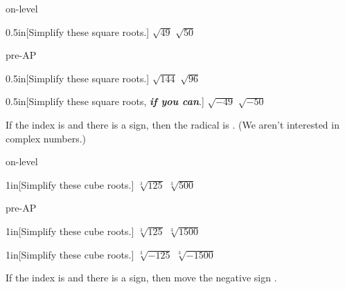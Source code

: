 \begin{taggedblock}{on-level}
    \begin{my2Problems}{0.5in}[Simplify these square roots.]
        {
            $\sqrt{49}$ 
        }
        {
            $\sqrt{50}$ 
        }
    \end{my2Problems}
\end{taggedblock}
\begin{taggedblock}{pre-AP}
    \begin{my2Problems}{0.5in}[Simplify these square roots.]
        {
                $\sqrt{144}$ 
            }
            {
                $\sqrt{96}$ 
            }
    \end{my2Problems}
\end{taggedblock}

\begin{my2Problems}{0.5in}[Simplify these square roots, {\bfseries\itshape if you can}.]
    {
        $\sqrt{-49}$ 
    }
    {
        $\sqrt{-50}$ 
    }
\end{my2Problems}

\begin{myCenteredBox}[width=6in]
    If the index is  and there is a  sign,
    then the radical is .
    (We aren't interested in complex numbers.)
\end{myCenteredBox}




\begin{taggedblock}{on-level}
    \begin{my2Problems}{1in}[Simplify these cube roots.]
        {
            $\sqrt[3]{125}$ 
        }
        {
            $\sqrt[3]{500}$ 
        }
    \end{my2Problems}
\end{taggedblock}
\begin{taggedblock}{pre-AP}
    \begin{my2Problems}{1in}[Simplify these cube roots.]
        {
            $\sqrt[3]{125}$ 
        }
        {
            $\sqrt[3]{1500}$ 
        }
    \end{my2Problems}
\end{taggedblock}
\begin{my2Problems}{1in}[Simplify these cube roots.]
    {
        $\sqrt[3]{-125}$ 
    }
    {
        $\sqrt[3]{-1500}$ 
    }
\end{my2Problems}

\begin{myCenteredBox}[width=6in]
    If the index is  and there is a  sign,
    then move the negative sign .
\end{myCenteredBox}


